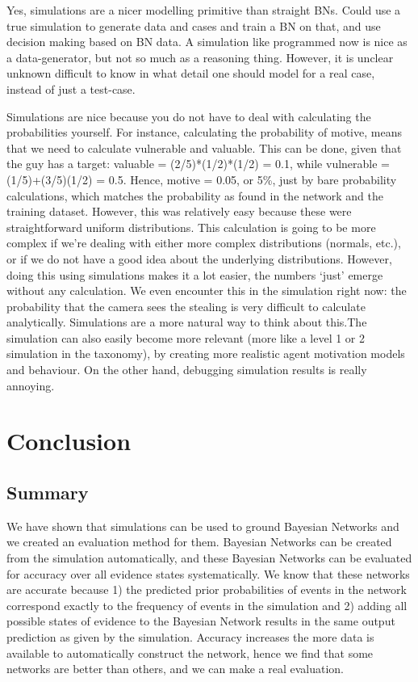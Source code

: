 \documentclass[12pt]{article}
\begin{document}
Yes, simulations are a nicer modelling primitive than straight BNs. Could use a true simulation to generate data and cases and train a BN on that, and use decision making based on BN data. A simulation like programmed now is nice as a data-generator, but not so much as a reasoning thing. However, it is unclear unknown difficult to know in what detail one should model for a real case, instead of just a test-case.

Simulations are nice because you do not have to deal with calculating the probabilities yourself. For instance, calculating the probability of motive, means that we need to calculate vulnerable and valuable. This can be done, given that the guy has a target: valuable = (2/5)*(1/2)*(1/2) = 0.1, while vulnerable = (1/5)+(3/5)(1/2) = 0.5. Hence, motive = 0.05, or 5\%, just by bare probability calculations, which matches the probability as found in the network and the training dataset. However, this was relatively easy because these were straightforward uniform distributions. This calculation is going to be more complex if we're dealing with either more complex distributions (normals, etc.), or if we do not have a good idea about the underlying distributions. However, doing this using simulations makes it a lot easier, the numbers `just' emerge without any calculation. We even encounter this in the simulation right now: the probability that the camera sees the stealing is very difficult to calculate analytically. Simulations are a more natural way to think about this.The simulation can also easily become more relevant (more like a level 1 or 2 simulation in the taxonomy), by creating more realistic agent motivation models and behaviour. On the other hand, debugging simulation results is really annoying.


\section{Conclusion}

\subsection{Summary}
We have shown that simulations can be used to ground Bayesian Networks and we created an evaluation method for them. Bayesian Networks can be created from the simulation automatically, and these Bayesian Networks can be evaluated for accuracy over all evidence states systematically. We know that these networks are accurate because 1) the predicted prior probabilities of events in the network correspond exactly to the frequency of events in the simulation and 2) adding all possible states of evidence to the Bayesian Network results in the same output prediction as given by the simulation. Accuracy increases the more data is available to automatically construct the network, hence we find that some networks are better than others, and we can make a real evaluation.
\end{document}
